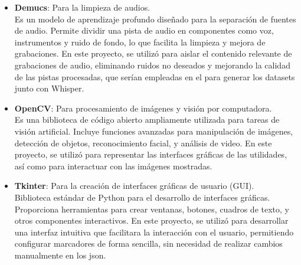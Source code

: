 \begin{itemize}
        En mi caso, se me asignaron trabajos o incidencias a resolver mediante dicha plataforma.
    \item \textbf{Demucs}: Para la limpieza de audios.\\
        Es un modelo\cite{demucs} de aprendizaje profundo diseñado para la separación de fuentes de audio. Permite dividir una pista de audio en componentes como voz, instrumentos y ruido de fondo, lo que facilita la limpieza y mejora de grabaciones. En este proyecto, se utilizó para aislar el contenido relevante de grabaciones de audio, eliminando ruidos no deseados y mejorando la calidad de las pistas procesadas, que serían empleadas en el para generar los datasets junto con Whisper.
     \item \textbf{OpenCV}: Para procesamiento de imágenes y visión por computadora.\\
        Es una biblioteca\cite{opencv} de código abierto ampliamente utilizada para tareas de visión artificial. Incluye funciones avanzadas para manipulación de imágenes, detección de objetos, reconocimiento facial, y análisis de video. En este proyecto, se utilizó para representar las interfaces gráficas de las utilidades, así como para interactuar con las imágenes mostradas.
    \item \textbf{Tkinter}: Para la creación de interfaces gráficas de usuario (GUI).\\
        Biblioteca estándar de Python para el desarrollo de interfaces gráficas. Proporciona herramientas para crear ventanas, botones, cuadros de texto, y otros componentes interactivos. En este proyecto, se utilizó para desarrollar una interfaz intuitiva que facilitara la interacción con el usuario, permitiendo configurar marcadores de forma sencilla, sin necesidad de realizar cambios manualmente en los json.

\end{itemize}